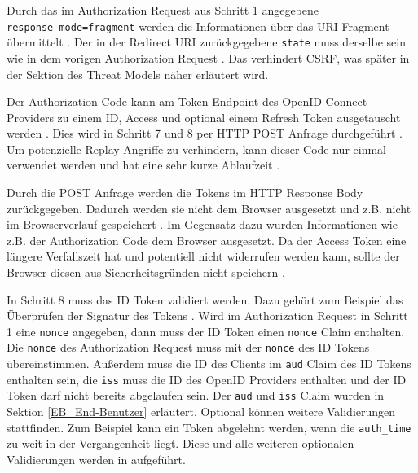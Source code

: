 Durch das im Authorization Request aus Schritt 1 angegebene \texttt{response\_mode=fragment} werden die Informationen über das URI Fragment übermittelt \cite[JavaScript Adapter Reference]{EB26}. Der in der Redirect URI zurückgegebene \texttt{state} muss derselbe sein wie in dem vorigen Authorization Request \cite[End-User Grants Authorization]{EB20}. Das verhindert CSRF, was später in der Sektion des Threat Models näher erläutert wird.


Der Authorization Code kann am Token Endpoint des OpenID Connect Providers zu einem ID, Access und optional einem Refresh Token ausgetauscht werden \cite[Token Endpoint]{EB4}. Dies wird in Schritt 7 und 8 per HTTP POST Anfrage durchgeführt \cite{EB20}. Um potenzielle Replay Angriffe zu verhindern, kann dieser Code nur einmal verwendet werden und hat eine sehr kurze Ablaufzeit \cite[Authorization Code Flow]{keycloakDocs}.

Durch die POST Anfrage werden die Tokens im HTTP Response Body zurückgegeben. Dadurch werden sie nicht dem Browser ausgesetzt \cite{EB22} und z.B. nicht im Browserverlauf gespeichert \cite[Implicit  Flow]{keycloakDocs}. Im Gegensatz dazu wurden Informationen wie z.B. der Authorization Code dem Browser ausgesetzt. Da der Access Token eine längere Verfallszeit hat und potentiell nicht widerrufen werden kann, sollte der Browser diesen aus Sicherheitsgründen nicht speichern \cite[Implicit  Flow]{keycloakDocs}.

In Schritt 8 muss das ID Token validiert werden. Dazu gehört zum Beispiel das Überprüfen der Signatur des Tokens \cite[ID Token Validation]{EB4}. Wird im Authorization Request in Schritt 1 eine \texttt{nonce} angegeben, dann muss der ID Token einen \texttt{nonce} Claim enthalten. Die \texttt{nonce} des Authorization Request muss mit der \texttt{nonce} des ID Tokens übereinstimmen. Außerdem muss die ID des Clients im \texttt{aud} Claim des ID Tokens enthalten sein, die \texttt{iss} muss die ID des OpenID Providers enthalten und der ID Token darf nicht bereits abgelaufen sein. Der \texttt{aud} und \texttt{iss} Claim wurden in Sektion \ref{EB_End-Benutzer} erläutert. Optional können weitere Validierungen stattfinden. Zum Beispiel kann ein Token abgelehnt werden, wenn die \texttt{auth\_time} zu weit in der Vergangenheit liegt. Diese und alle weiteren optionalen Validierungen werden in \cite[ID Token Validation]{EB4} aufgeführt.

